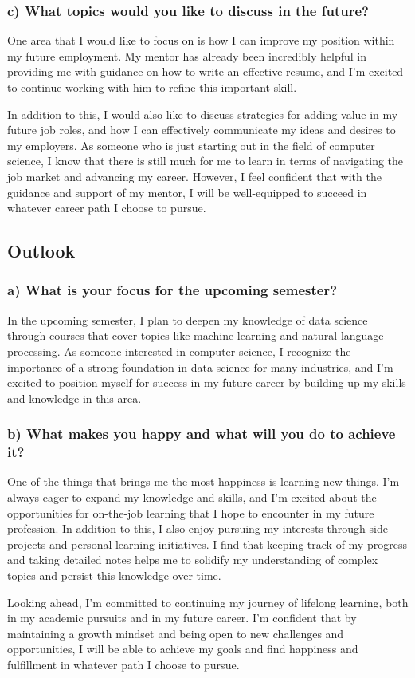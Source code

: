 \documentclass{core/report-template}
\begin{document}
\subsubsection{c) What topics would you like to discuss in the future?}
One area that I would like to focus on is how I can improve my position within my future employment. My mentor has already been incredibly helpful in providing me with guidance on how to write an effective resume, and I'm excited to continue working with him to refine this important skill.

In addition to this, I would also like to discuss strategies for adding value in my future job roles, and how I can effectively communicate my ideas and desires to my employers. As someone who is just starting out in the field of computer science, I know that there is still much for me to learn in terms of navigating the job market and advancing my career. However, I feel confident that with the guidance and support of my mentor, I will be well-equipped to succeed in whatever career path I choose to pursue.


\subsection{Outlook}
\subsubsection{a) What is your focus for the upcoming semester?}
In the upcoming semester, I plan to deepen my knowledge of data science through courses that cover topics like machine learning and natural language processing. As someone interested in computer science, I recognize the importance of a strong foundation in data science for many industries, and I'm excited to position myself for success in my future career by building up my skills and knowledge in this area.

\subsubsection{b) What makes you happy and what will you do to achieve it?}
One of the things that brings me the most happiness is learning new things. I'm always eager to expand my knowledge and skills, and I'm excited about the opportunities for on-the-job learning that I hope to encounter in my future profession. In addition to this, I also enjoy pursuing my interests through side projects and personal learning initiatives. I find that keeping track of my progress and taking detailed notes helps me to solidify my understanding of complex topics and persist this knowledge over time.

Looking ahead, I'm committed to continuing my journey of lifelong learning, both in my academic pursuits and in my future career. I'm confident that by maintaining a growth mindset and being open to new challenges and opportunities, I will be able to achieve my goals and find happiness and fulfillment in whatever path I choose to pursue.

\end{document}
